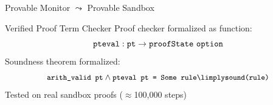 \documentclass[slidestop,aspectratio=169]{beamer}
\providecommand{\KeYmaeraX}{KeYmaera X\xspace}
\newcommand{\Isabelle}{Isabelle\xspace}
\newcommand{\CakeML}{CakeML\xspace}
\newcommand{\ctrlMon}{\textsf{\upshape ctrlMon}\xspace}
\newcommand{\plantMon}{\textsf{\upshape plantMon}\xspace}
\newcommand{\goback}{\!\!\!\!}
\theoremstyle{plain}
\theoremstyle{definition}
\theoremstyle{remark}
\begin{document}
\begin{frame}[t]{Provable Monitor $\leadsto$ Provable Sandbox}
\end{frame}

\begin{frame}[t]{Verified Proof Term Checker}
Proof checker formalized as function:
\[{\tt pteval} : {\tt pt} \to {\tt proofState\ option}\]\pause
Soundness theorem formalized:
\[\small\texttt{arith\_valid pt} \land \texttt{pteval\ pt = Some rule} \limply \texttt{sound(rule)}\]\pause
Tested on real sandbox proofs ($\approx$100,000 steps)
\end{frame}
\end{document}

